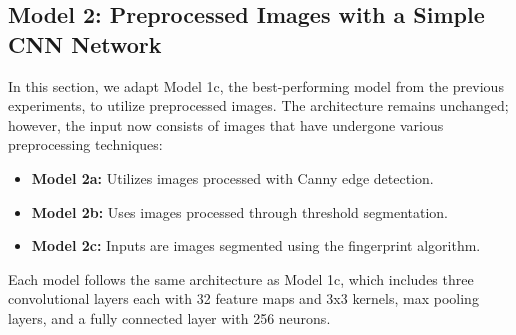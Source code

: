 \subsection{Model 2: Preprocessed Images with a Simple CNN Network}

In this section, we adapt Model 1c, the best-performing model from the previous experiments, to utilize preprocessed images. The architecture remains unchanged; however, the input now consists of images that have undergone various preprocessing techniques:

\begin{itemize}
    \item \textbf{Model 2a:} Utilizes images processed with Canny edge detection.
    \item \textbf{Model 2b:} Uses images processed through threshold segmentation.
    \item \textbf{Model 2c:} Inputs are images segmented using the fingerprint algorithm.
\end{itemize}

Each model follows the same architecture as Model 1c, which includes three convolutional layers each with 32 feature maps and 3x3 kernels, max pooling layers, and a fully connected layer with 256 neurons.

